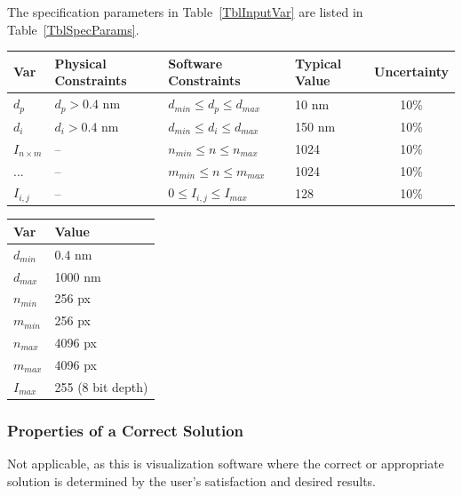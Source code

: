 \documentclass[12pt]{article}
\begin{document}
The specification parameters in Table~\ref{TblInputVar} are listed in
Table~\ref{TblSpecParams}.

\begin{table}[!h]
  \caption{Input Variables} \label{TblInputVar}
  \renewcommand{\arraystretch}{1.2}
\noindent \begin{longtable*}{l l l l c} 
  \toprule
  \textbf{Var} & \textbf{Physical Constraints} & \textbf{Software Constraints} &
                             \textbf{Typical Value} & \textbf{Uncertainty}\\
  \midrule 
  $d_p$ & $d_p > 0.4$ \si{nm} & $d_{min} \leq d_p \leq d_{max}$ & 10 \si{nm} & 10\% \\
  $d_i$ & $d_i > 0.4$ \si{nm} & $d_{min} \leq d_i \leq d_{max}$ & 150 \si{nm} & 10\% \\
  $I_{n \times m}$ & -- & $n_{min} \leq n \leq n_{max}$ & 1024 & 10\% \\
   ... & -- & $m_{min} \leq n \leq m_{max}$ & 1024 & 10\% \\
  $I_{i,j}$ & -- & $0 \leq I_{i,j} \leq I_{max}$ & 128 & 10\% \\
  \bottomrule
\end{longtable*}
\end{table}

\begin{table}[!h]
\caption{Specification Parameter Values} \label{TblSpecParams}
\renewcommand{\arraystretch}{1.2}
\noindent \begin{longtable*}{l l} 
  \toprule
  \textbf{Var} & \textbf{Value} \\
  \midrule 
  $d_{min}$ & 0.4 \si{\nm}\\
  $d_{max}$ & 1000 \si{\nm}\\
  $n_{min}$ & 256 px\\
  $m_{min}$ & 256 px\\
  $n_{max}$ & 4096 px\\
  $m_{max}$ & 4096 px\\
  $I_{max}$ & 255 (8 bit depth)\\
  \bottomrule
\end{longtable*}
\end{table}

\subsubsection{Properties of a Correct Solution} \label{sec_CorrectSolution}

\noindent
Not applicable, as this is visualization software where the correct or 
appropriate solution is determined by the user's satisfaction and desired results.
\end{document}
